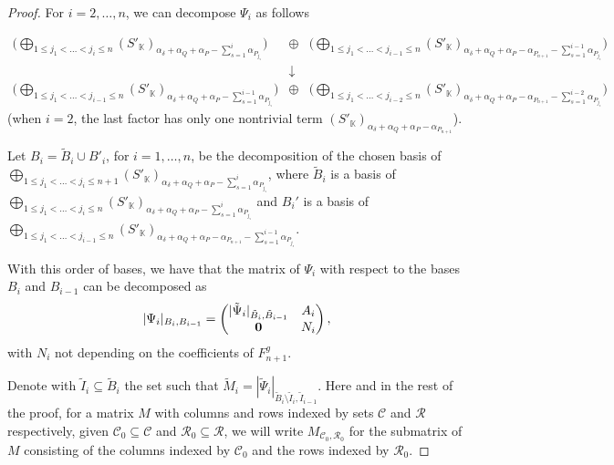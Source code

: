 \documentclass[10pt,a4paper]{amsart}
\newcommand{\K}{\mathbb{K}}
\begin{document}
\begin{proof}
For $i=2, \dots, n$, we can decompose $\Psi_{i}$ as follows

\begin{equation}\label{dec}
\begin{array}{ccl}\bigg(\bigoplus\limits_{1\leq j_1<\ldots<j_i\leq n}(S'_\K)_{\alpha_\delta+\alpha_Q+\alpha_P-\sum\limits_{s=1}^i \alpha_{P_{j_s}}}\bigg) & \oplus &\bigg(\bigoplus\limits_{1\leq j_1<\ldots<j_{i-1}\leq n}(S'_\K)_{\alpha_\delta+\alpha_Q+\alpha_P-\alpha_{P_{n+1}}-\sum\limits_{s=1}^{i-1} \alpha_{P_{j_s}}}\bigg)
\\
& \downarrow &
\\
\bigg(\bigoplus\limits_{1\leq j_1<\ldots<j_{i-1}\leq n}(S'_\K)_{\alpha_\delta+\alpha_Q+\alpha_P-\sum\limits_{s=1}^{i-1} \alpha_{P_{j_s}}}\bigg)&\oplus&\bigg(\bigoplus\limits_{1\leq j_1<\ldots<j_{i-2}\leq n}(S'_\K)_{\alpha_\delta+\alpha_Q+\alpha_P-\alpha_{P_{n+1}}-\sum\limits_{s=1}^{i-2} \alpha_{P_{j_s}}}\bigg)
\end{array}
\end{equation}
(when $i=2$, the last factor has only one nontrivial term $(S'_\K)_{\alpha_\delta+\alpha_Q+\alpha_P-\alpha_{P_{n+1}}}$).

Let $B_i = \tilde{B}_i \cup B'_i$, for $i=1,\dots, n$, be the decomposition of the chosen basis of $\bigoplus\limits_{1\leq j_1<\ldots<j_i\leq n+1}(S'_\K)_{\alpha_\delta+\alpha_Q+\alpha_P-\sum\limits_{s=1}^i \alpha_{P_{j_s}}}$, where $\tilde{B}_i$ is a basis of $\bigoplus\limits_{1\leq j_1<\ldots<j_i\leq n}(S'_\K)_{\alpha_\delta+\alpha_Q+\alpha_P-\sum\limits_{s=1}^i \alpha_{P_{j_s}}}$ and $B_i'$ is a basis of $\bigoplus\limits_{1\leq j_1<\ldots<j_{i-1}\leq n}(S'_\K)_{\alpha_\delta+\alpha_Q+\alpha_P-\alpha_{P_{n+1}}-\sum\limits_{s=1}^{i-1} \alpha_{P_{j_s}}}$.

With this order of bases, we have that the matrix of  $\Psi_{i}$ with respect to the bases $B_i$ and $B_{i-1}$ can be decomposed as
$$|\Psi_i|_{B_i, B_{i-1}}= \begin{pmatrix}
 |\tilde{\Psi}_{i}|_{ \tilde{B}_i, \tilde{B}_{i-1}}& A_i\\
 {\bf 0}& N_i
\end{pmatrix},
$$
with $N_i$ not depending on the coefficients of $F^g_{n+1}.$

Denote with $\tilde{I}_i\subseteq \tilde{B}_i$ the set such that
$\tilde{M}_i = |\tilde{\Psi}_{i}|_{ \tilde{B}_i\setminus \tilde{I}_i, \tilde{I}_{i-1}}$. Here and in the rest of the proof, for a matrix $M$ with columns and rows indexed by sets $\mathcal{C}$ and $\mathcal{R}$ respectively, given $\mathcal{C}_0\subseteq \mathcal{C}$ and $\mathcal{R}_0\subseteq \mathcal{R}$, we will write $M_{\mathcal{C}_0,\mathcal{R}_0}$ for the submatrix of $M$ consisting of the columns indexed by $\mathcal{C}_0$ and the rows indexed by $\mathcal{R}_0$.



\end{proof}
\end{document}
